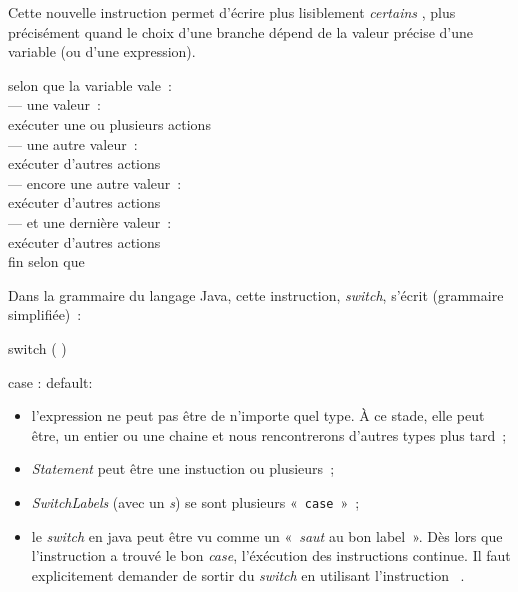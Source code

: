 	Cette nouvelle instruction permet d’écrire plus lisiblement \emph{certains}
	, plus précisément quand le choix d’une branche dépend
	de la valeur précise d’une variable (ou d’une expression).

	\begin{langagenaturel}
		selon que la variable vale~:\\
			\tab — une valeur~:\\
				\tab\tab exécuter une ou plusieurs actions\\
			\tab — une autre valeur~:\\
				\tab\tab exécuter d'autres actions\\
			\tab — encore une autre valeur~:\\
				\tab\tab exécuter d'autres actions\\
			\tab — et une dernière valeur~:\\
				\tab\tab exécuter d'autres actions\\
		fin selon que 
	\end{langagenaturel}

	Dans la grammaire  du langage Java, cette instruction, \textit{switch}, 
	s'écrit (grammaire simplifiée)~:

	\begin{grammaire}
		    switch (  ) 


		    case :
		    default:
	\end{grammaire}
	
	\begin{itemize}
		\item l'expression ne peut pas être de n'importe quel type. À ce stade, 
			elle peut être, un entier ou une chaine et nous rencontrerons 
			d'autres types plus tard~;
		\item \textit{Statement} peut être une instuction ou plusieurs~;
		\item \textit{SwitchLabels} (avec un \textit{s}) se sont plusieurs 
			«~\texttt{case}~»~;
		\item le \textit{switch} en java peut être vu comme un «~\textit{saut}
			au bon label~». Dès lors que l'instruction a trouvé le bon
			\textit{case}, l'éxécution des instructions continue. Il faut
			explicitement demander de sortir du \textit{switch} en utilisant
			l'instruction \textbf{}~.
	\end{itemize}

